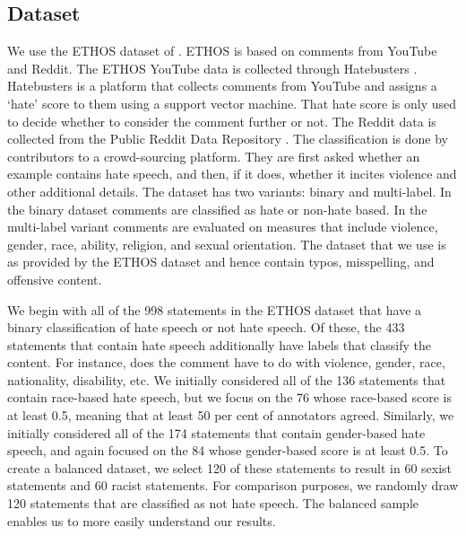 \documentclass[12pt,]{article}
\begin{document}
\hypertarget{dataset}{%
\subsection{Dataset}\label{dataset}}

We use the ETHOS dataset of \citet{mollas2020ethos}. ETHOS is based on comments from YouTube and Reddit. The ETHOS YouTube data is collected through Hatebusters \citep{anagnostou2018hatebusters}. Hatebusters is a platform that collects comments from YouTube and assigns a `hate' score to them using a support vector machine. That hate score is only used to decide whether to consider the comment further or not. The Reddit data is collected from the Public Reddit Data Repository \citep{baumgartner2020pushshift}. The classification is done by contributors to a crowd-sourcing platform. They are first asked whether an example contains hate speech, and then, if it does, whether it incites violence and other additional details. The dataset has two variants: binary and multi-label. In the binary dataset comments are classified as hate or non-hate based. In the multi-label variant comments are evaluated on measures that include violence, gender, race, ability, religion, and sexual orientation. The dataset that we use is as provided by the ETHOS dataset and hence contain typos, misspelling, and offensive content.

We begin with all of the 998 statements in the ETHOS dataset that have a binary classification of hate speech or not hate speech. Of these, the 433 statements that contain hate speech additionally have labels that classify the content. For instance, does the comment have to do with violence, gender, race, nationality, disability, etc. We initially considered all of the 136 statements that contain race-based hate speech, but we focus on the 76 whose race-based score is at least 0.5, meaning that at least 50 per cent of annotators agreed. Similarly, we initially considered all of the 174 statements that contain gender-based hate speech, and again focused on the 84 whose gender-based score is at least 0.5. To create a balanced dataset, we select 120 of these statements to result in 60 sexist statements and 60 racist statements. For comparison purposes, we randomly draw 120 statements that are classified as not hate speech. The balanced sample enables us to more easily understand our results.
\end{document}
